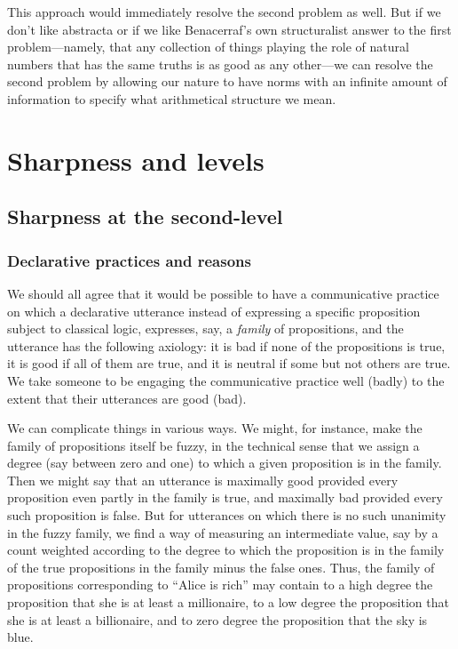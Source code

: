 This approach would immediately resolve the second problem as well. But if we don't like abstracta or if we like 
Benacerraf's own structuralist answer
to the first problem---namely, that any collection of things playing the role of natural numbers that has the 
same truths is as good as any other---we can resolve the second problem by allowing our nature to have norms
with an infinite amount of information to specify what arithmetical structure we mean. 

\section{Sharpness and levels}
\subsection{Sharpness at the second-level}\label{sec:limiting}
\subsubsection{Declarative practices and reasons}
We should all agree that it would be possible to have a communicative practice on which a declarative utterance instead of expressing 
a specific proposition subject to classical logic, expresses, say, a \textit{family} of propositions, and the utterance has the following
axiology: it is bad if none of the propositions is true, it is good if all of them are true, and it is neutral if some but not others are
true. We take someone to be engaging the communicative practice well (badly) to the extent that their utterances are good (bad).

We can complicate things in various ways. We might, for instance, make the family of propositions itself be fuzzy, in the technical sense that we assign
a degree (say between zero and one) to which a given proposition is in the family. Then we might say that an utterance is maximally good provided every proposition
even partly in the family is true, and maximally bad provided every such proposition is false. But for utterances on which there is no
such unanimity in the fuzzy family, we find a way of measuring an intermediate value, say by a count weighted according to the degree 
to which the proposition is in the family of the true propositions in the family minus the false ones. Thus, the family of propositions
corresponding to ``Alice is rich'' may contain to a high degree the proposition that she is at least a millionaire, to a low degree 
the proposition that she is at least a billionaire, and to zero degree the proposition that the sky is blue. 

